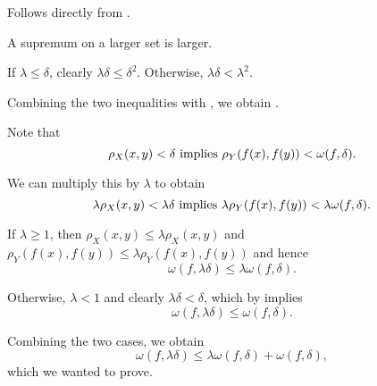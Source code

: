 \begin{RefListProof}
     Follows directly from .

     A supremum on a larger set is larger.

     If \( \lambda \leq \delta \), clearly \( \lambda \delta \leq \delta^2 \). Otherwise, \( \lambda \delta < \lambda^2 \).

    Combining the two inequalities with , we obtain .

     Note that
    \begin{equation*}
      \rho_X(x, y) < \delta \text{ implies } \rho_Y(f(x), f(y)) < \omega(f, \delta).
    \end{equation*}

    We can multiply this by \( \lambda \) to obtain
    \begin{equation*}
      \lambda \rho_X(x, y) < \lambda \delta \text{ implies } \lambda \rho_Y(f(x), f(y)) < \lambda \omega(f, \delta).
    \end{equation*}

    If \( \lambda \geq 1 \), then \( \rho_X(x, y) \leq \lambda \rho_X(x, y) \) and \( \rho_Y(f(x), f(y)) \leq \lambda \rho_Y(f(x), f(y)) \) and hence
    \begin{equation*}
      \omega(f, \lambda \delta) \leq \lambda \omega(f, \delta).
    \end{equation*}

    Otherwise, \( \lambda < 1 \) and clearly \( \lambda \delta < \delta \), which by  implies
    \begin{equation*}
      \omega(f, \lambda \delta) \leq \omega(f, \delta).
    \end{equation*}

    Combining the two cases, we obtain
    \begin{equation*}
      \omega(f, \lambda \delta) \leq \lambda \omega(f, \delta) + \omega(f, \delta),
    \end{equation*}
    which we wanted to prove.
\end{RefListProof}

